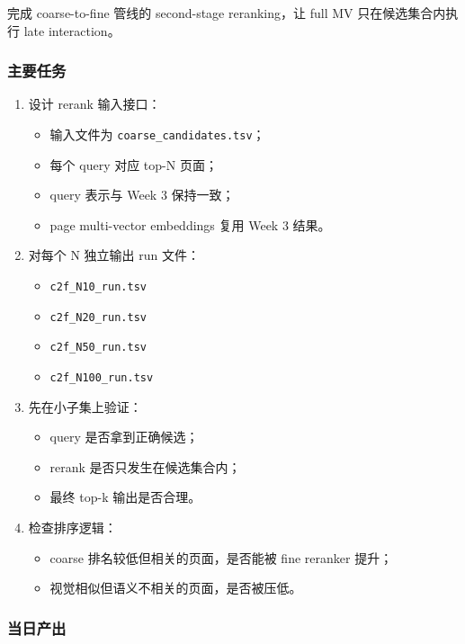 \documentclass[UTF8,a4paper,12pt]{ctexart}
\begin{document}
	完成 coarse-to-fine 管线的 second-stage reranking，让 full MV 只在候选集合内执行 late interaction。
	
	\subsubsection*{主要任务}
	
	\begin{enumerate}[leftmargin=2em]
		\item 设计 rerank 输入接口：
		\begin{itemize}
			\item 输入文件为 \texttt{coarse\_candidates.tsv}；
			\item 每个 query 对应 top-N 页面；
			\item query 表示与 Week 3 保持一致；
			\item page multi-vector embeddings 复用 Week 3 结果。
		\end{itemize}
		
		\item 对每个 N 独立输出 run 文件：
		\begin{itemize}
			\item \texttt{c2f\_N10\_run.tsv}
			\item \texttt{c2f\_N20\_run.tsv}
			\item \texttt{c2f\_N50\_run.tsv}
			\item \texttt{c2f\_N100\_run.tsv}
		\end{itemize}
		
		\item 先在小子集上验证：
		\begin{itemize}
			\item query 是否拿到正确候选；
			\item rerank 是否只发生在候选集合内；
			\item 最终 top-k 输出是否合理。
		\end{itemize}
		
		\item 检查排序逻辑：
		\begin{itemize}
			\item coarse 排名较低但相关的页面，是否能被 fine reranker 提升；
			\item 视觉相似但语义不相关的页面，是否被压低。
		\end{itemize}
	\end{enumerate}
	
	\subsubsection*{当日产出}
	
\end{document}
